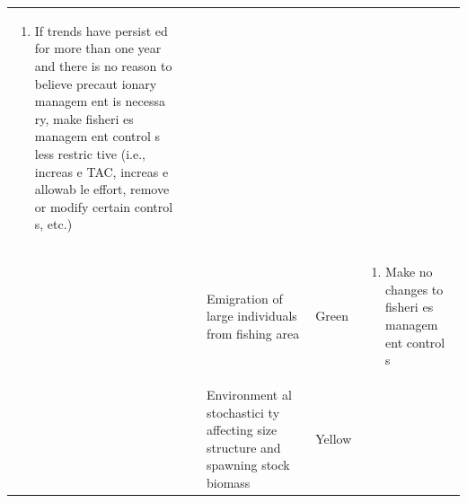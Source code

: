 \documentclass[]{book}
\providecommand{\tightlist}{%
  \setlength{\itemsep}{0pt}\setlength{\parskip}{0pt}}
\begin{document}
\begin{longtable}[]{@{}lllll@{}}
\begin{minipage}[t]{0.19\columnwidth}
\begin{enumerate}
\def\labelenumi{\arabic{enumi}.}
\tightlist
\item
  If trends have persist ed for more than one year and there is no
  reason to believe precaut ionary managem ent is necessa ry, make
  fisheri es managem ent control s less restric tive (i.e., increas e
  TAC, increas e allowab le effort, remove or modify certain control s,
  etc.)
\end{enumerate}\strut
\end{minipage}\tabularnewline
\begin{minipage}[t]{0.19\columnwidth}\raggedright\strut
\strut
\end{minipage} & \begin{minipage}[t]{0.19\columnwidth}\raggedright\strut
\strut
\end{minipage} & \begin{minipage}[t]{0.19\columnwidth}\raggedright\strut
Emigration of large individuals from fishing area\strut
\end{minipage} & \begin{minipage}[t]{0.19\columnwidth}\raggedright\strut
Green\strut
\end{minipage} & \begin{minipage}[t]{0.19\columnwidth}\raggedright\strut
\begin{enumerate}
\def\labelenumi{\arabic{enumi}.}
\tightlist
\item
  Make no changes to fisheri es managem ent control s
\end{enumerate}\strut
\end{minipage}\tabularnewline
\begin{minipage}[t]{0.19\columnwidth}\raggedright\strut
\strut
\end{minipage} & \begin{minipage}[t]{0.19\columnwidth}\raggedright\strut
\strut
\end{minipage} & \begin{minipage}[t]{0.19\columnwidth}\raggedright\strut
Environment al stochastici ty affecting size structure and spawning
stock biomass\strut
\end{minipage} & \begin{minipage}[t]{0.19\columnwidth}\raggedright\strut
Yellow\strut
\end{minipage} & \begin{minipage}[t]{0.19\columnwidth}\raggedright\strut
\begin{enumerate}
\def\labelenumi{\arabic{enumi}.}

\end{enumerate}
\end{minipage}
\end{longtable}
\end{document}
